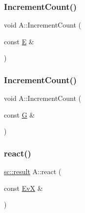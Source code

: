 \subsubsection{\texorpdfstring{Increment\+Count()}{IncrementCount()}\hspace{0.1cm}{\footnotesize\ttfamily [2/3]}}
{\footnotesize\ttfamily void A\+::\+Increment\+Count (\begin{DoxyParamCaption}\item[{const \mbox{\hyperlink{struct_e}{E}} \&}]{ }\end{DoxyParamCaption})\hspace{0.3cm}{\ttfamily [inline]}}

\mbox{\label{struct_a_abf23b59d725012e048a7f5e3ae1c52ca}} 
\subsubsection{\texorpdfstring{Increment\+Count()}{IncrementCount()}\hspace{0.1cm}{\footnotesize\ttfamily [3/3]}}
{\footnotesize\ttfamily void A\+::\+Increment\+Count (\begin{DoxyParamCaption}\item[{const \mbox{\hyperlink{struct_g}{G}} \&}]{ }\end{DoxyParamCaption})\hspace{0.3cm}{\ttfamily [inline]}}

\mbox{\label{struct_a_adf85098984576064f58c36259a6b58c9}} 
\subsubsection{\texorpdfstring{react()}{react()}\hspace{0.1cm}{\footnotesize\ttfamily [1/11]}}
{\footnotesize\ttfamily \mbox{\hyperlink{namespaceboost_1_1statechart_abe807f6598b614d6d87bb951ecd92331}{sc\+::result}} A\+::react (\begin{DoxyParamCaption}\item[{const \mbox{\hyperlink{struct_ev_x}{EvX}} \&}]{ }\end{DoxyParamCaption})\hspace{0.3cm}{\ttfamily [inline]}}

